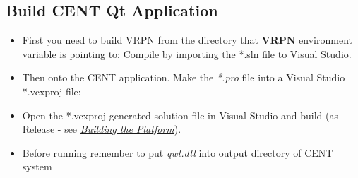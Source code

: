 \documentclass[letterpaper,10pt,english]{sphinxmanual}
\begin{document}
\subsection{Build CENT Qt Application}
\label{index:build-cent}\label{index:build-cent-qt-application}\begin{itemize}
\item {} 
First you need to build VRPN from the directory that \textbf{VRPN} environment variable is pointing to: Compile by importing the *.sln file to Visual Studio.

\item {} 
Then onto the CENT application. Make the \emph{*.pro} file into a Visual Studio *.vcxproj file:
\begin{quote}

\end{quote}

\item {} 
Open the *.vcxproj generated solution file in Visual Studio and build (as Release - see {\hyperref[index:build-plat]{\emph{Building the Platform}}}).

\item {} 
Before running remember to put \emph{qwt.dll} into output directory of CENT system

\end{itemize}
\end{document}
